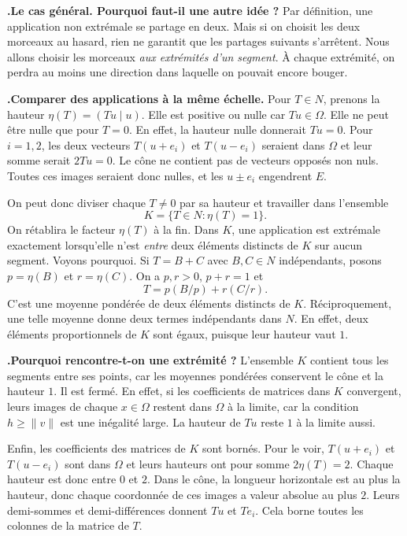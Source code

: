 \documentclass[a4paper,12pt]{article}
\newcommand{\Om}{\Omega}
\newcommand{\norm}[1]{\lVert #1\rVert}
\newcommand{\ps}[2]{(#1\mid #2)}
\newcounter{pas}
\newcommand{\etape}[1]{\par\Needspace{2.25\baselineskip}\smallskip\stepcounter{pas}%
  \textbf{\textcolor{deep}{\thepas.\enspace #1}}\enspace\ignorespaces}
\begin{document}
\etape{Le cas général. Pourquoi faut-il une autre idée ?}
Par définition, une application non extrémale se partage en deux. Mais si on choisit les deux morceaux au hasard, rien ne garantit que les partages suivants s'arrêtent. Nous allons choisir les morceaux \emph{aux extrémités d'un segment}. À chaque extrémité, on perdra au moins une direction dans laquelle on pouvait encore bouger.

\etape{Comparer des applications à la même échelle.}
Pour $T\in N$, prenons la hauteur $\eta(T)=\ps{Tu}{u}$. Elle est positive ou nulle car $Tu\in\Om$. Elle ne peut être nulle que pour $T=0$. En effet, la hauteur nulle donnerait $Tu=0$. Pour $i=1,2$, les deux vecteurs $T(u+e_i)$ et $T(u-e_i)$ seraient dans $\Om$ et leur somme serait $2Tu=0$. Le cône ne contient pas de vecteurs opposés non nuls. Toutes ces images seraient donc nulles, et les $u\pm e_i$ engendrent $E$.

On peut donc diviser chaque $T\ne0$ par sa hauteur et travailler dans l'ensemble
\[
                     K=\{T\in N:\eta(T)=1\}.
\]
On rétablira le facteur $\eta(T)$ à la fin. Dans $K$, une application est extrémale exactement lorsqu'elle n'est \emph{entre} deux éléments distincts de $K$ sur aucun segment. Voyons pourquoi. Si $T=B+C$ avec $B,C\in N$ indépendants, posons $p=\eta(B)$ et $r=\eta(C)$. On a $p,r>0$, $p+r=1$ et
\[
                       T=p(B/p)+r(C/r).
\]
C'est une moyenne pondérée de deux éléments distincts de $K$. Réciproquement, une telle moyenne donne deux termes indépendants dans $N$. En effet, deux éléments proportionnels de $K$ sont égaux, puisque leur hauteur vaut $1$.

\etape{Pourquoi rencontre-t-on une extrémité ?}
L'ensemble $K$ contient tous les segments entre ses points, car les moyennes pondérées conservent le cône et la hauteur $1$. Il est fermé. En effet, si les coefficients de matrices dans $K$ convergent, leurs images de chaque $x\in\Om$ restent dans $\Om$ à la limite, car la condition $h\geq\norm v$ est une inégalité large. La hauteur de $Tu$ reste $1$ à la limite aussi.

Enfin, les coefficients des matrices de $K$ sont bornés. Pour le voir, $T(u+e_i)$ et $T(u-e_i)$ sont dans $\Om$ et leurs hauteurs ont pour somme $2\eta(T)=2$. Chaque hauteur est donc entre $0$ et $2$. Dans le cône, la longueur horizontale est au plus la hauteur, donc chaque coordonnée de ces images a valeur absolue au plus $2$. Leurs demi-sommes et demi-différences donnent $Tu$ et $Te_i$. Cela borne toutes les colonnes de la matrice de $T$.
\end{document}
